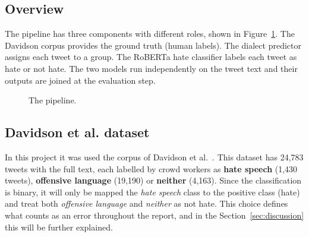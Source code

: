 \documentclass[runningheads,a4paper,oribibl]{llncs}
\begin{document}
\subsection{Overview}
The pipeline has three components with different roles, shown in Figure~\ref{fig:pipeline}.
The Davidson corpus provides the ground truth (human labels). The dialect predictor assigns
each tweet to a group. The RoBERTa hate classifier labels each tweet  as hate or not hate.
The two models run independently on the tweet text and their outputs are joined at the evaluation step.

\begin{figure}
   \centering
   \caption{The pipeline.\label{fig:pipeline}}
\end{figure}

\subsection{Davidson et al. dataset}
In this project it was used the corpus of Davidson et al.~\cite{davidson2017}. This dataset has
24,783 tweets with the full text, each labelled by crowd workers as \textbf{hate speech} (1,430 tweets),
\textbf{offensive language} (19,190) or \textbf{neither} (4,163). Since the classification is binary, 
it will only be mapped the  \emph{hate speech} class to the positive class (hate) and treat both \emph{offensive language} 
and \emph{neither} as not hate. This choice defines what counts as an error throughout the report,
and in the Section~\ref{sec:discussion} this will be further explained.
\end{document}

